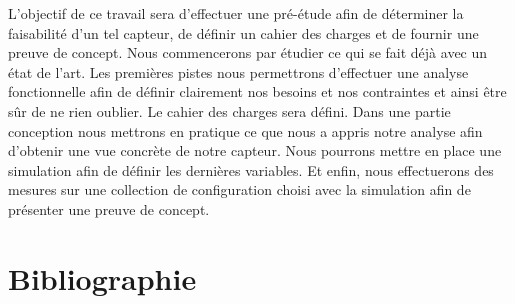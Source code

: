 \documentclass[a4paper, french, 10pt]{article} %
\begin{document}
L'objectif de ce travail sera d'effectuer une pré-étude afin de déterminer la faisabilité d'un tel capteur, de définir un cahier des charges et de fournir une preuve de concept. Nous commencerons par étudier ce qui se fait déjà avec un état de l'art. Les premières pistes nous permettrons d'effectuer une analyse fonctionnelle afin de définir clairement nos besoins et nos contraintes et ainsi être sûr de ne rien oublier. Le cahier des charges sera défini. Dans une partie conception nous mettrons en pratique ce que nous a appris notre analyse afin d'obtenir une vue concrète de notre capteur. Nous pourrons mettre en place une simulation afin de définir les dernières variables. Et enfin, nous effectuerons des mesures sur une collection de configuration choisi avec la simulation afin de présenter une preuve de concept.














\section{Bibliographie}

\printbibliography


\end{document}
